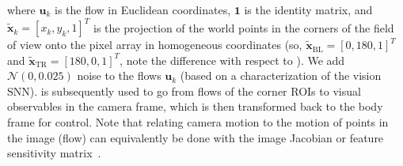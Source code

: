 where $\boldsymbol{u}_k$ is the flow in Euclidean coordinates, $\boldsymbol{1}$ is the identity matrix, and $\tilde{\boldsymbol{x}}_k = [x_k,y_k,1]^T$ is the projection of the world points in the corners of the field of view onto the pixel array in homogeneous coordinates (so, $\tilde{\boldsymbol{x}}_{\mathrm{BL}} = [0,180,1]^T$ and $\tilde{\boldsymbol{x}}_{\mathrm{TR}}=[180,0,1]^T$, note the difference with respect to ). We add $\mathcal{N}(0, 0.025)$ noise to the flows $\boldsymbol{u}_k$ (based on a characterization of the vision SNN).  is subsequently used to go from flows of the corner ROIs to visual observables in the camera frame, which is then transformed back to the body frame for control. Note that relating camera motion to the motion of points in the image (flow) can equivalently be done with the image Jacobian or feature sensitivity matrix~\cite{corke2011robotics}.

